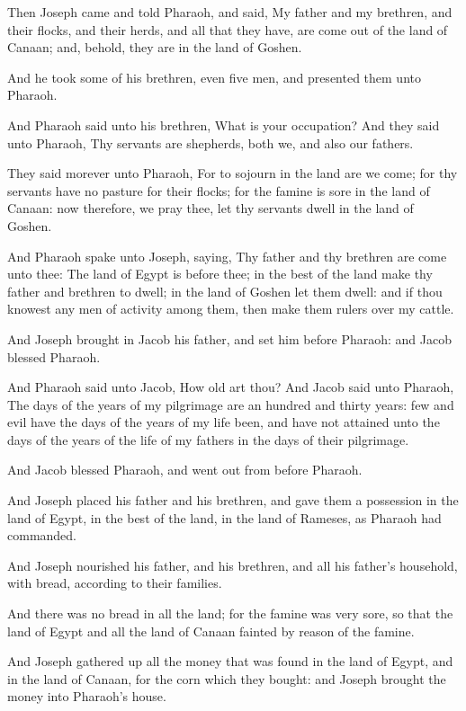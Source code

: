 \verse Then Joseph came and told Pharaoh, and said, My father and my brethren, and their flocks, and their herds, and all that they have, are come out of the land of Canaan; and, behold, they are in the land of Goshen.

\verse And he took some of his brethren, even five men, and presented them unto Pharaoh.

\verse And Pharaoh said unto his brethren, What is your occupation? And they said unto Pharaoh, Thy servants are shepherds, both we, and also our fathers.

\verse They said morever unto Pharaoh, For to sojourn in the land are we come; for thy servants have no pasture for their flocks; for the famine is sore in the land of Canaan: now therefore, we pray thee, let thy servants dwell in the land of Goshen.

\verse And Pharaoh spake unto Joseph, saying, Thy father and thy brethren are come unto thee: \verse The land of Egypt is before thee; in the best of the land make thy father and brethren to dwell; in the land of Goshen let them dwell: and if thou knowest any men of activity among them, then make them rulers over my cattle.

\verse And Joseph brought in Jacob his father, and set him before Pharaoh: and Jacob blessed Pharaoh.

\verse And Pharaoh said unto Jacob, How old art thou?  \verse And Jacob said unto Pharaoh, The days of the years of my pilgrimage are an hundred and thirty years: few and evil have the days of the years of my life been, and have not attained unto the days of the years of the life of my fathers in the days of their pilgrimage.

\verse And Jacob blessed Pharaoh, and went out from before Pharaoh.

\verse And Joseph placed his father and his brethren, and gave them a possession in the land of Egypt, in the best of the land, in the land of Rameses, as Pharaoh had commanded.

\verse And Joseph nourished his father, and his brethren, and all his father's household, with bread, according to their families.

\verse And there was no bread in all the land; for the famine was very sore, so that the land of Egypt and all the land of Canaan fainted by reason of the famine.

\verse And Joseph gathered up all the money that was found in the land of Egypt, and in the land of Canaan, for the corn which they bought: and Joseph brought the money into Pharaoh's house.

